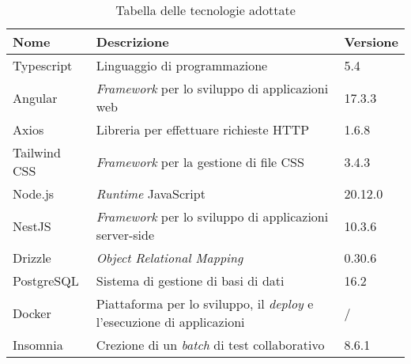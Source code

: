 \begin{table}[H]
	\centering
	\begin{tabularx}{\textwidth}{lXl}
		\hline
		\textbf{Nome} & \textbf{Descrizione}                                                           & \textbf{Versione} \\
		\hline
		Typescript    & Linguaggio di programmazione                                                   & 5.4               \\
		\hline
		Angular       & \textit{Framework} per lo sviluppo di applicazioni web                         & 17.3.3            \\
		\hline
		Axios         & Libreria per effettuare richieste HTTP                                         & 1.6.8             \\
		\hline
		Tailwind CSS  & \textit{Framework} per la gestione di file CSS                                 & 3.4.3             \\
		\hline
		Node.js       & \textit{Runtime} JavaScript                                                    & 20.12.0           \\
		\hline
		NestJS        & \textit{Framework} per lo sviluppo di applicazioni server-side                 & 10.3.6            \\
		\hline
		Drizzle       & \textit{Object Relational Mapping}                                             & 0.30.6            \\
		\hline
		PostgreSQL    & Sistema di gestione di basi di dati                                            & 16.2              \\
		\hline
		Docker        & Piattaforma per lo sviluppo, il \textit{deploy} e l'esecuzione di applicazioni & /                 \\
		\hline
		Insomnia      & Crezione di un \textit{batch} di test collaborativo                            & 8.6.1             \\
		\hline
	\end{tabularx}
	\caption{Tabella delle tecnologie adottate}
\end{table}
